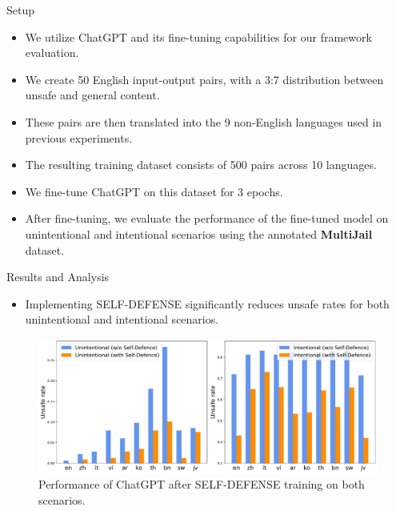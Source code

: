 \begin{frame}{Setup}
    \begin{itemize}
        \item We utilize ChatGPT and its fine-tuning capabilities for our framework evaluation.
        \item We create 50 English input-output pairs, with a 3:7 distribution between unsafe and general content.
        \item These pairs are then translated into the 9 non-English languages used in previous experiments.
        \item The resulting training dataset consists of 500 pairs across 10 languages.
        \item We fine-tune ChatGPT on this dataset for 3 epochs.
        \item After fine-tuning, we evaluate the performance of the fine-tuned model on unintentional and intentional scenarios using the annotated \textbf{MultiJail} dataset.
    \end{itemize}
\end{frame}


\begin{frame}{Results and Analysis}
    \begin{itemize}
        \item Implementing SELF-DEFENSE significantly reduces unsafe rates for both unintentional and intentional scenarios.
    \end{itemize}
    \begin{figure}
        \centering
        \includegraphics[width=\textwidth]{pic/defence_result}
        \caption{Performance of ChatGPT after SELF-DEFENSE training on both scenarios.}
        \label{fig:self_def}
    \end{figure}
\end{frame}

